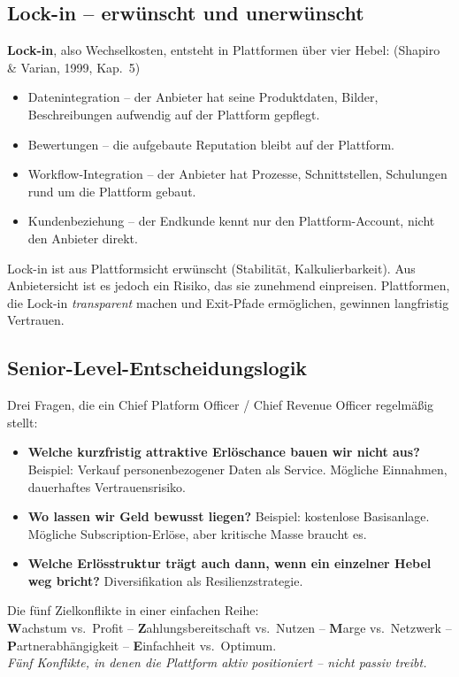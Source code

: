 \documentclass[11pt,a4paper,oneside]{article}
\newcommand{\caveatfontfallback}{\itshape}
\newcommand\caveatfont{\caveatfontfallback}%
\newcommand{\akzent}[1]{{\caveatfont\color{lpAmber}#1}}
\newcommand{\fachbegriff}[1]{\textbf{#1}}
\newcommand{\quelle}[1]{{\footnotesize\color{lpGray}(#1)}}
\begin{document}
\subsection{Lock-in -- erwünscht und unerwünscht}

\fachbegriff{Lock-in}, also Wechselkosten, entsteht in Plattformen über vier Hebel: \quelle{Shapiro \& Varian, 1999, Kap.~5}

\begin{itemize}
  \item Datenintegration -- der Anbieter hat seine Produktdaten, Bilder, Beschreibungen aufwendig auf der Plattform gepflegt.
  \item Bewertungen -- die aufgebaute Reputation bleibt auf der Plattform.
  \item Workflow-Integration -- der Anbieter hat Prozesse, Schnittstellen, Schulungen rund um die Plattform gebaut.
  \item Kundenbeziehung -- der Endkunde kennt nur den Plattform-Account, nicht den Anbieter direkt.
\end{itemize}

Lock-in ist aus Plattformsicht erwünscht (Stabilität, Kalkulierbarkeit). Aus Anbietersicht ist es jedoch ein Risiko, das sie zunehmend einpreisen. Plattformen, die Lock-in \emph{transparent} machen und Exit-Pfade ermöglichen, gewinnen langfristig Vertrauen.

\subsection{Senior-Level-Entscheidungslogik}

Drei Fragen, die ein Chief Platform Officer / Chief Revenue Officer regelmäßig stellt:

\begin{itemize}
  \item \textbf{Welche kurzfristig attraktive Erlöschance bauen wir nicht aus?} Beispiel: Verkauf personenbezogener Daten als Service. Mögliche Einnahmen, dauerhaftes Vertrauensrisiko.
  \item \textbf{Wo lassen wir Geld bewusst liegen?} Beispiel: kostenlose Basisanlage. Mögliche Subscription-Erlöse, aber kritische Masse braucht es.
  \item \textbf{Welche Erlösstruktur trägt auch dann, wenn ein einzelner Hebel weg bricht?} Diversifikation als Resilienzstrategie.
\end{itemize}

\begin{eselsbox}[Eselsbrücke: \akzent{W-Z-M-P-E}]
Die fünf Zielkonflikte in einer einfachen Reihe:\\[2pt]
\textbf{W}achstum vs.\ Profit -- \textbf{Z}ahlungsbereitschaft vs.\ Nutzen -- \textbf{M}arge vs.\ Netzwerk -- \textbf{P}artnerabhängigkeit -- \textbf{E}infachheit vs.\ Optimum.\\[2pt]
\emph{Fünf Konflikte, in denen die Plattform aktiv positioniert -- nicht passiv treibt.}
\end{eselsbox}
\end{document}
